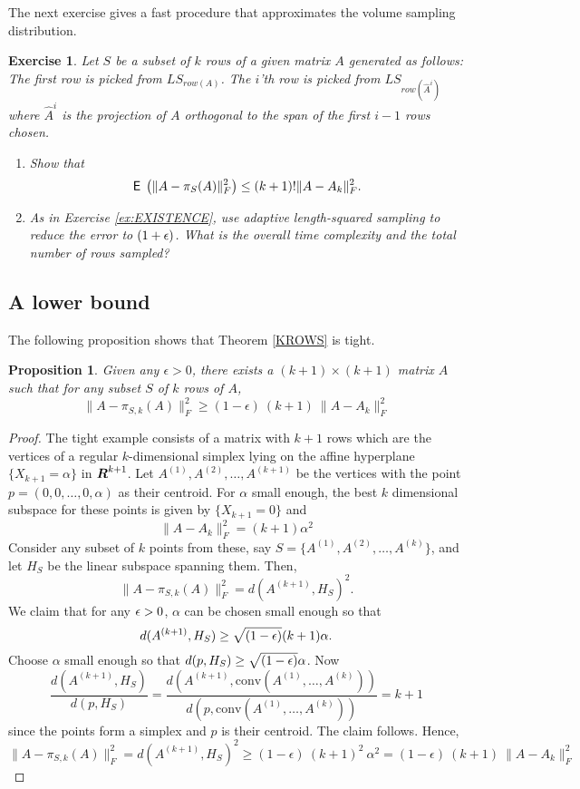 \documentclass{book}
\newtheorem{proposition}[theorem]{Proposition}
\newtheorem{exercise}{Exercise}
\numberwithin{exercise}{chapter}
\begin{document}
The next exercise gives a fast procedure that approximates the volume sampling distribution.

\begin{exercise}
Let $S$ be a subset of $k$ rows of a given matrix $A$ generated as follows: The first row is picked from $LS_{row(A)}$. The $i$'th row is picked from $LS_{row(\hat{A}^i)}$ where $\hat{A}^i$ is the projection of $A$ orthogonal to the span of the first $i-1$ rows chosen.
\begin{enumerate}
\item Show that
\[
\hbox{{\sf E}\;}\left(\|A-\pi_{S}(A)\|_F^2\right) \le (k+1)! \|A-A_k\|_F^2.
\]
\item As in Exercise \ref{ex:EXISTENCE}, use adaptive length-squared sampling to reduce the error to $(1+\epsilon)$. What is the overall time complexity and the total number of rows sampled?
\end{enumerate}
\end{exercise}


\subsection{A lower bound}
The following proposition shows
that Theorem \ref{KROWS} is tight.
\begin{proposition}\label{TIGHT}
Given any $\epsilon > 0$, there exists a $(k+1) \times (k+1)$
matrix $A$ such that for any subset $S$ of $k$ rows of $A$,
\[ \| A - \pi_{S,k} (A) \|_F^2 \geq (1-\epsilon)~(k+1)~ \| A - A_k \|_F^2
\]
\end{proposition}
\begin{proof}
The tight example consists of a matrix with $k+1$ rows which are
the vertices of a regular $k$-dimensional simplex lying on the
affine hyperplane $\{ X_{k+1} = \alpha \}$ in $\mbox{\mbox{\boldmath $R$}}^{k+1}$. Let
$A^{(1)}, A^{(2)}, \ldots, A^{(k+1)}$ be the vertices with the
point $p = (0,0, \ldots, 0, \alpha)$ as their centroid. For
$\alpha$ small enough, the best $k$ dimensional subspace for these
points is given by $\{ X_{k+1}=0 \}$ and
\[ \| A - A_k
\|_F^2 = (k+1) \alpha^2 \] Consider any subset of $k$ points from
these, say $S = \{ A^{(1)}, A^{(2)}, \ldots, A^{(k)} \}$, and let
$H_S$ be the linear subspace spanning them. Then,
\[
\| A - \pi_{S,k}(A) \|_F^2 = d(A^{(k+1)}, H_S)^2.
\]
We claim that for any $\epsilon > 0$, $\alpha$ can be chosen small
enough so that
\[
d(A^{(k+1)}, H_S) \ge \sqrt{(1-\epsilon)} (k+1)\alpha.
\]
Choose $\alpha$ small enough so that $d(p,H_S) \ge
\sqrt{(1-\epsilon)}\alpha$. Now
\[
\frac{d(A^{(k+1)},H_S)}{d(p,H_S)} = \frac{d(A^{(k+1)},
\mbox{conv}(A^{(1)},\ldots,A^{(k)}))}{d(p,
\mbox{conv}(A^{(1)},\ldots,A^{(k)}))} = k+1
\]
since the points form a simplex and $p$ is their centroid. The
claim follows. Hence,
\[ \| A - \pi_{S,k} (A) \|_F^2 = d(A^{(k+1)}, H_S)^2 \geq (1-\epsilon)~
(k+1)^2~ \alpha^2 = (1-\epsilon)~ (k+1)~ \| A - A_k \|_F^2 \]
\end{proof}
\end{document}
